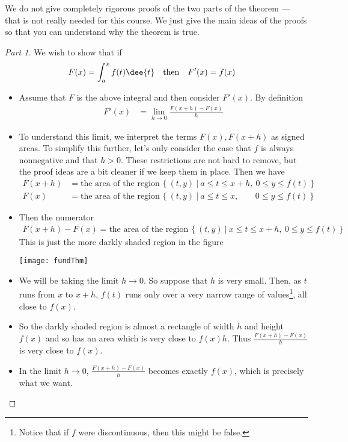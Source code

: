 We do not give completely rigorous proofs of the two parts of the theorem ---
that is not really needed for this course. We just give the main ideas of the
proofs so that you can understand why the theorem is true.
\begin{proof}[Part 1] We wish to show that if
\begin{align*}
  F(x) &= \int_a^x f(t) \dee{t} & \text{then}&&
  F'(x) &= f(x)
\end{align*}
\begin{itemize}
 \item Assume that $F$ is the above integral and then consider $F'(x)$. By
  definition
  \begin{align*}
  F'(x) &=\lim_{h\rightarrow 0} \frac{F(x+h)-F(x)}{h}
  \end{align*}

\item To understand this limit, we interpret the terms $F(x), F(x+h)$ as signed
areas. To simplify this further, let's only consider the case that $f$ is always
nonnegative and that $h>0$. These restrictions are not hard to remove, but the
proof ideas are a bit cleaner if we keep them in place. Then we have
\begin{align*}
F(x+h)&=\text{the area of the region $\big\{\ (t,y)\ \big|\ a\le t\le x+h,\
                0\le y\le f(t)\ \big\}$} \\
F(x)&=\text{the area of the region $\big\{\ (t,y)\ \big|\ a\le t\le x,
                  \phantom{+h\ \,}\
                                             0\le y\le f(t)\ \big\}$}
\end{align*}

\item Then the numerator
\begin{align*}
F(x+h)-F(x)=\text{the area of the region $\big\{\ (t,y)\ \big|\ x\le t\le x+h,\
                0\le y\le f(t)\ \big\}$}
\end{align*}
This is just the more darkly shaded region in the figure
\begin{efig}
\begin{center}
    \texttt{[image: fundThm]}
\end{center}
\end{efig}

\item We will be taking the limit $h\rightarrow 0$. So suppose that $h$ is
very small. Then, as $t$ runs from $x$ to $x+h$, $f(t)$ runs only over
a very narrow range of values\footnote{Notice that if $f$ were
discontinuous, then this might be false.}, all close to $f(x)$.

\item So the darkly shaded region is almost a rectangle of width $h$ and height
$f(x)$ and so has an area which is very close to $f(x)h$. Thus
$\frac{F(x+h)-F(x)}{h}$ is very close to $f(x)$.
\item In the limit $h\rightarrow 0$, $\frac{F(x+h)-F(x)}{h}$ becomes
exactly $f(x)$, which is precisely what we want.
\end{itemize}
\end{proof}


